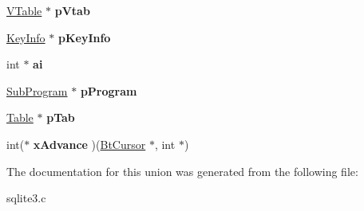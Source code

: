 \begin{DoxyCompactItemize}
\item 
\hyperlink{structVTable}{V\+Table} $\ast$ {\bfseries p\+Vtab}\hypertarget{unionVdbeOp_1_1p4union_a25abd8bcf2df2f591e2dc6c377f8f427}{}\label{unionVdbeOp_1_1p4union_a25abd8bcf2df2f591e2dc6c377f8f427}

\item 
\hyperlink{structKeyInfo}{Key\+Info} $\ast$ {\bfseries p\+Key\+Info}\hypertarget{unionVdbeOp_1_1p4union_acda5935a8938d01e523d0eb79b0c1e72}{}\label{unionVdbeOp_1_1p4union_acda5935a8938d01e523d0eb79b0c1e72}

\item 
int $\ast$ {\bfseries ai}\hypertarget{unionVdbeOp_1_1p4union_a1bd30fbce8b173d7270d04dc714863f3}{}\label{unionVdbeOp_1_1p4union_a1bd30fbce8b173d7270d04dc714863f3}

\item 
\hyperlink{structSubProgram}{Sub\+Program} $\ast$ {\bfseries p\+Program}\hypertarget{unionVdbeOp_1_1p4union_ac72a98a54ea6ddd7b168af47fab46a41}{}\label{unionVdbeOp_1_1p4union_ac72a98a54ea6ddd7b168af47fab46a41}

\item 
\hyperlink{structTable}{Table} $\ast$ {\bfseries p\+Tab}\hypertarget{unionVdbeOp_1_1p4union_af846307afcc87ba2ca357108d3c48edf}{}\label{unionVdbeOp_1_1p4union_af846307afcc87ba2ca357108d3c48edf}

\item 
int($\ast$ {\bfseries x\+Advance} )(\hyperlink{structBtCursor}{Bt\+Cursor} $\ast$, int $\ast$)\hypertarget{unionVdbeOp_1_1p4union_abede37475ebf4b3c05a43cef11281f4e}{}\label{unionVdbeOp_1_1p4union_abede37475ebf4b3c05a43cef11281f4e}

\end{DoxyCompactItemize}


The documentation for this union was generated from the following file\+:\begin{DoxyCompactItemize}
\item 
sqlite3.\+c\end{DoxyCompactItemize}

